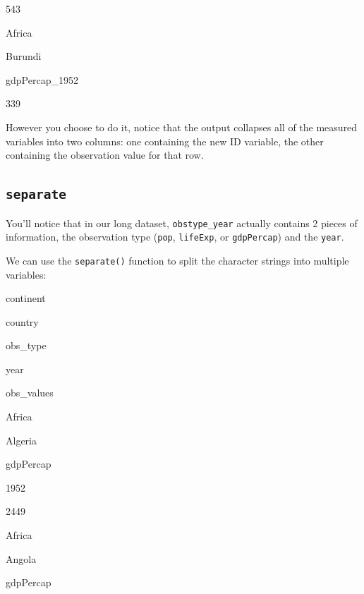 \documentclass[]{book}
\newenvironment{Shaded}{\begin{snugshade}}{\end{snugshade}}
\newcommand{\DataTypeTok}[1]{\textcolor[rgb]{0.13,0.29,0.53}{#1}}
\newcommand{\KeywordTok}[1]{\textcolor[rgb]{0.13,0.29,0.53}{\textbf{#1}}}
\newcommand{\NormalTok}[1]{#1}
\newcommand{\OperatorTok}[1]{\textcolor[rgb]{0.81,0.36,0.00}{\textbf{#1}}}
\newcommand{\StringTok}[1]{\textcolor[rgb]{0.31,0.60,0.02}{#1}}
\begin{document}
543

Africa

Burundi

gdpPercap\_1952

339

However you choose to do it, notice that the output collapses all of the measured variables into two columns: one containing the new ID variable, the other containing the observation value for that row.

\hypertarget{separate}{%
\subsection{\texorpdfstring{\texttt{separate}}{separate}}\label{separate}}

You'll notice that in our long dataset, \texttt{obstype\_year} actually contains 2 pieces of information, the observation type (\texttt{pop}, \texttt{lifeExp}, or \texttt{gdpPercap}) and the \texttt{year}.

We can use the \texttt{separate()} function to split the character strings into multiple variables:

\begin{Shaded}
\end{Shaded}

continent

country

obs\_type

year

obs\_values

Africa

Algeria

gdpPercap

1952

2449

Africa

Angola

gdpPercap
\end{document}
